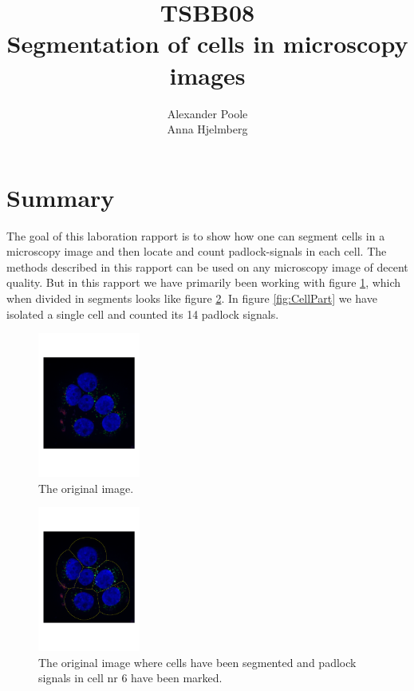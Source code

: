 \documentclass[10pt,twocolumn]{article}
\title{TSBB08 \\ Segmentation of cells in microscopy images}
\author{Alexander Poole \\ Anna Hjelmberg}
\begin{document}
\maketitle
	\thispagestyle{empty}
\newpage

\section{Summary}
The goal of this laboration rapport is to show how one can segment cells in a
microscopy image and then locate and count padlock-signals in each cell.
The methods described in this rapport can be used on any microscopy image of decent quality.
But in this rapport we have primarily been working with figure \ref{fig:ImColour},
which when divided in segments looks like figure \ref{fig:CellLinesNCircles}.
In figure \ref{fig:CellPart} we have isolated a single cell and counted its 14 padlock signals.

\begin{figure}[ht]
\centering
\includegraphics[width=0.3\textwidth]{Bilder/ImColour.pdf}
\caption{The original image.}
\label{fig:ImColour}
\end{figure}

\begin{figure}[ht]
\centering
\includegraphics[width=0.3\textwidth]{Bilder/CellLinesNCircles.pdf}
\caption{The original image where cells have been segmented and padlock signals in cell nr 6 have been marked.}
\label{fig:CellLinesNCircles}
\end{figure}
\end{document}
